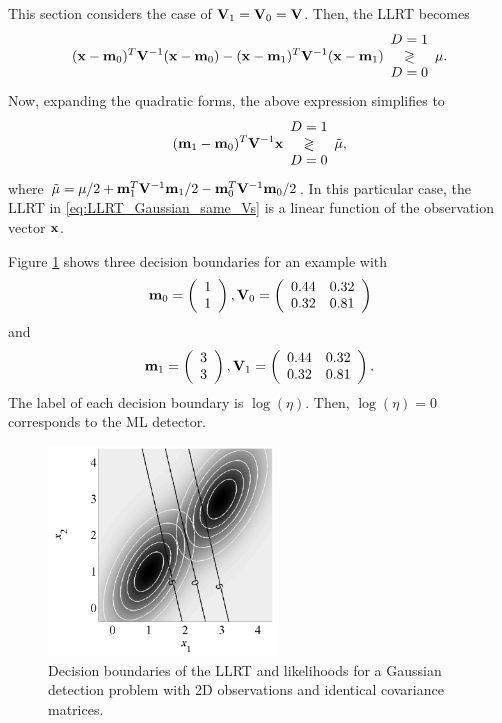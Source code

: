 This section considers the case of ${\bf V}_1 = {\bf V}_0 = {\bf V}$. Then, the LLRT becomes
\begin{equation*}
({\bf x}-{\bf m}_0)^T {\bf V}^{-1}({\bf x}-{\bf m}_0) 
- ({\bf x}-{\bf m}_1)^T {\bf V}^{-1}({\bf x}-{\bf m}_1)
\begin{array}{c} D=1 \\ \gtrless \\ D=0 \end{array} \mu.
\end{equation*}
Now, expanding the quadratic forms, the above expression simplifies to
\begin{equation}
 ({\bf m}_1-{\bf m}_0)^T {\bf V}^{-1}{\bf x} \begin{array}{c} D=1 \\ \gtrless \\ D=0 \end{array} \tilde{\mu},
 \label{eq:LLRT_Gaussian_same_Vs}
\end{equation}
where $\tilde{\mu} = \mu/2 + {\bf m}_1^T {\bf V}^{-1}{\bf m}_1/2 - {\bf m}_0^T {\bf V}^{-1}{\bf m}_0/2$. In this particular case, the LLRT in \eqref{eq:LLRT_Gaussian_same_Vs} is a linear function of the observation vector ${\bf x}$.

\begin{example}
	Figure \ref{Dec:DecGauss2Deqv} shows three decision boundaries for an example with
		\begin{equation*}
			{\bf m}_0 =  \left(\begin{array}{l}  1\\1  \end{array}\right), {\bf V}_0 = 
			\left(\begin{array}{ll} 0.44 & 0.32 \\ 0.32 & 0.81 \end{array} \right)
\end{equation*}
and
\begin{equation*}
{\bf m}_1 = \left(\begin{array}{l}  3\\3 \end{array}\right), {\bf V}_1 = 
\left(\begin{array}{ll} 0.44 & 0.32 \\ 0.32 & 0.81 \end{array} \right).
\end{equation*}
The label of each decision boundary is $\log(\eta)$. Then, $\log(\eta) = 0$ corresponds to the ML detector.
	\begin{figure}[htb]
		\begin{center}
			\includegraphics[width=6cm]{Figures/DecGauss2Deqv.pdf}
			\caption{Decision boundaries of the LLRT and likelihoods for a Gaussian detection problem with 2D observations and identical covariance matrices.}
			\label{Dec:DecGauss2Deqv}
		\end{center}
	\end{figure}
\end{example}

